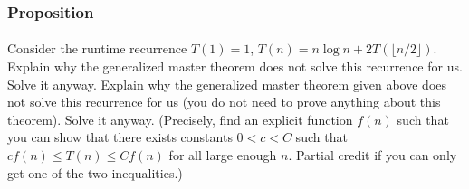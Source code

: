 \documentclass{article}
\begin{document}
\subsubsection{Proposition}
\paragraph{\indent}
Consider the runtime recurrence \(T(1) = 1\), \(T(n) = n \log n + 2T(\lfloor n/2 \rfloor)\). Explain why
the generalized master theorem does not solve this recurrence for us. Solve it
anyway. Explain why the generalized master theorem given above does not solve this
recurrence for us (you do not need to prove anything about this theorem). Solve it
anyway. (Precisely, find an explicit function \(f(n)\) such that you can show that there exists
constants \(0 < c < C\) such that \(c f(n) \leq T(n) \leq C f(n)\) for all large enough \(n\). Partial
credit if you can only get one of the two inequalities.)
\end{document}
